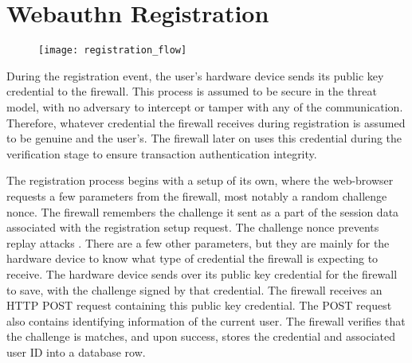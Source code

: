 



\section{Webauthn Registration}

\begin{figure}[h]
  \centering
  \texttt{[image: registration\_flow]}
\end{figure}

During the registration event, the user's hardware device sends its public key credential to the firewall. This process is assumed to be secure in the threat model, with no adversary to intercept or tamper with any of the communication. Therefore, whatever credential the firewall receives during registration is assumed to be genuine and the user's. The firewall later on uses this credential during the verification stage to ensure transaction authentication integrity. 


The registration process begins with a setup of its own, where the web-browser requests a few parameters from the firewall, most notably a random challenge nonce. The firewall remembers the challenge it sent as a part of the session data associated with the registration setup request. The challenge nonce prevents replay attacks \cite{TODO-replay-attack}. There are a few other parameters, but they are mainly for the hardware device to know what type of credential the firewall is expecting to receive. The hardware device sends over its public key credential for the firewall to save, with the challenge signed by that credential. The firewall receives an HTTP POST request containing this public key credential. The POST request also contains identifying information of the current user. The firewall verifies that the challenge is matches, and upon success, stores the credential and associated user ID into a database row.

